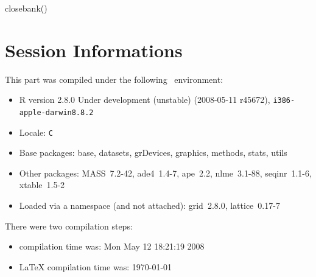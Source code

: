 \documentclass{article}
\begin{document}
\begin{Schunk}
\begin{Sinput}
 closebank()
\end{Sinput}
\end{Schunk}


\section*{Session Informations}

This part was compiled under the following \Rlogo{}~environment:

\begin{itemize}
  \item R version 2.8.0 Under development (unstable) (2008-05-11 r45672), \verb|i386-apple-darwin8.8.2|
  \item Locale: \verb|C|
  \item Base packages: base, datasets, grDevices, graphics, methods,
    stats, utils
  \item Other packages: MASS~7.2-42, ade4~1.4-7, ape~2.2,
    nlme~3.1-88, seqinr~1.1-6, xtable~1.5-2
  \item Loaded via a namespace (and not attached): grid~2.8.0,
    lattice~0.17-7
\end{itemize}
There were two compilation steps:

\begin{itemize}
  \item \Rlogo{} compilation time was: Mon May 12 18:21:19 2008
  \item \LaTeX{} compilation time was: \today
\end{itemize}


\clearpage
{}


\end{document}
